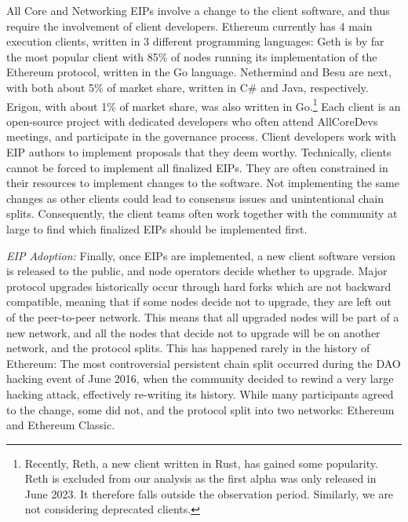 \documentclass[No]{AEA}
\begin{document}
All Core and Networking EIPs involve a change to the client software, and thus require the involvement of client developers. Ethereum currently has 4 main execution clients, written in 3 different programming languages: Geth is by far the most popular client with 85\% of nodes running its implementation of the Ethereum protocol, written in the Go language. Nethermind and Besu are next, with both about 5\% of market share, written in C\# and Java, respectively. Erigon, with about 1\% of market share, was also written in Go.\footnote{Recently, Reth, a new client written in Rust, has gained some popularity. Reth is excluded from our analysis as the first alpha was only released in June 2023. It therefore falls outside the observation period. Similarly, we are not considering deprecated clients.} Each client is an open-source project with dedicated developers who often attend AllCoreDevs meetings, and participate in the governance process. Client developers work with EIP authors to implement proposals that they deem worthy. Technically, clients cannot be forced to implement all finalized EIPs. They are often constrained in their resources to implement changes to the software. Not implementing the same changes as other clients could lead to consensus issues and unintentional chain splits. Consequently, the client teams often work together with the community at large to find which finalized EIPs should be implemented first.

\textit{EIP Adoption:} Finally, once EIPs are implemented, a new client software version is released to the public, and node operators decide whether to upgrade. Major protocol upgrades historically occur through hard forks which are not backward compatible, meaning that if some nodes decide not to upgrade, they are left out of the peer-to-peer network. This means that all upgraded nodes will be part of a new network, and all the nodes that decide not to upgrade will be on another network, and the protocol splits. This has happened rarely in the history of Ethereum: The most controversial persistent chain split occurred during the DAO hacking event of June 2016, when the community decided to rewind a very large hacking attack, effectively re-writing its history. While many participants agreed to the change, some did not, and the protocol split into two networks: Ethereum and Ethereum Classic. 
\end{document}
